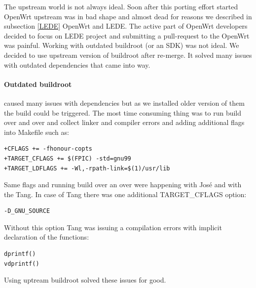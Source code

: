 The upstream world is not always ideal.
Soon after this porting effort started OpenWrt upstream was in bad shape and almost dead for reasons we described in subsection \ref{LEDE} OpenWrt and LEDE.
The active part of OpenWrt developers decided to focus on LEDE project and submitting a pull-request to the OpenWrt was painful.
Working with outdated buildroot (or an SDK) was not ideal.
We decided to use upstream version of buildroot after re-merge.
It solved many issues with outdated dependencies that came into way.

\paragraph{Outdated buildroot} caused many issues with dependencies but as we installed older version of them the build could be triggered.
The most time consuming thing was to run build over and over and collect linker and compiler errors and adding additional flags into Makefile such as:
\begin{lstlisting}[columns=fixed,basicstyle=\ttfamily\footnotesize,tabsize=4,backgroundcolor=\color{yellow!10}]
+CFLAGS += -fhonour-copts
+TARGET_CFLAGS += $(FPIC) -std=gnu99
+TARGET_LDFLAGS += -Wl,-rpath-link=$(1)/usr/lib
\end{lstlisting}
Same flags and running build over an over were happening with José and with the Tang.
In case of Tang there was one additional TARGET\_CFLAGS option:
\begin{lstlisting}[columns=fixed,basicstyle=\ttfamily\footnotesize,tabsize=4,backgroundcolor=\color{yellow!10}]
-D_GNU_SOURCE
\end{lstlisting}
Without this option Tang was issuing a compilation errors with implicit declaration of the functions:
\begin{lstlisting}[columns=fixed,basicstyle=\ttfamily\footnotesize,tabsize=4,backgroundcolor=\color{yellow!10}]
dprintf()
vdprintf()
\end{lstlisting}
Using uptream buildroot solved these issues for good.

